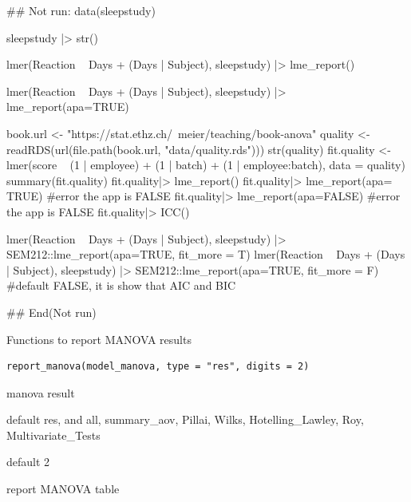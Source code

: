 \documentclass[a4paper]{book}
\begin{document}
%
\begin{Examples}
\begin{ExampleCode}
## Not run: 
data(sleepstudy)

sleepstudy |> str()

lmer(Reaction ~ Days + (Days | Subject), sleepstudy) |> lme_report()

lmer(Reaction ~ Days + (Days | Subject), sleepstudy) |> lme_report(apa=TRUE)


book.url <- "https://stat.ethz.ch/~meier/teaching/book-anova"
quality <- readRDS(url(file.path(book.url, "data/quality.rds")))
str(quality)
fit.quality <- lmer(score ~ (1 | employee) + (1 | batch) +
                     (1 | employee:batch), data = quality)
summary(fit.quality)
fit.quality|> lme_report()
fit.quality|> lme_report(apa= TRUE) #error the app is FALSE
fit.quality|> lme_report(apa=FALSE) #error the app is FALSE
fit.quality|> ICC()

lmer(Reaction ~ Days + (Days | Subject), sleepstudy) |>
SEM212::lme_report(apa=TRUE, fit_more = T)
lmer(Reaction ~ Days + (Days | Subject), sleepstudy) |>
SEM212::lme_report(apa=TRUE, fit_more = F)  #default FALSE, it is show that AIC and BIC


## End(Not run)

\end{ExampleCode}
\end{Examples}
%
\begin{Description}
Functions to report MANOVA results
\end{Description}
%
\begin{Usage}
\begin{verbatim}
report_manova(model_manova, type = "res", digits = 2)
\end{verbatim}
\end{Usage}
%
\begin{Arguments}
\begin{ldescription}
\item[\code{model\_manova}] manova result

\item[\code{type}] default res, and all, summary\_aov, Pillai, Wilks, Hotelling\_Lawley, Roy, Multivariate\_Tests

\item[\code{digits}] default 2
\end{ldescription}
\end{Arguments}
%
\begin{Value}
report MANOVA table
\end{Value}
\end{document}
